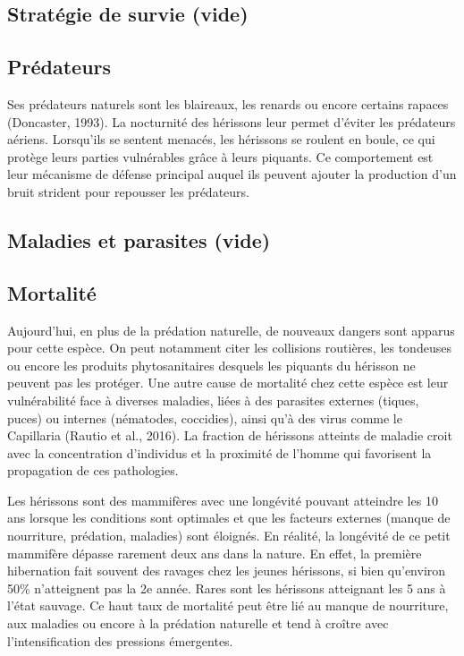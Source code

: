 \documentclass[a4paper,11pt]{article}
\begin{document}
\subsection{Stratégie de survie (vide)}

\subsection{Prédateurs}
Ses prédateurs naturels sont les blaireaux, les renards ou encore certains rapaces (Doncaster, 1993). La nocturnité des hérissons leur permet d’éviter les prédateurs aériens. Lorsqu'ils se sentent menacés, les hérissons se roulent en boule, ce qui protège leurs parties vulnérables grâce à leurs piquants. Ce comportement est leur mécanisme de défense principal auquel ils peuvent ajouter la production d’un bruit strident pour repousser les prédateurs. 

\subsection{Maladies et parasites (vide)}

\subsection{Mortalité}
Aujourd’hui, en plus de la prédation naturelle, de nouveaux dangers sont apparus pour cette espèce. On peut notamment citer les collisions routières, les tondeuses ou encore les produits phytosanitaires desquels les piquants du hérisson ne peuvent pas les protéger. Une autre cause de mortalité chez cette espèce est leur vulnérabilité face à diverses maladies, liées à des parasites externes (tiques, puces) ou internes (nématodes, coccidies), ainsi qu’à des virus comme le Capillaria (Rautio et al., 2016). La fraction de hérissons atteints de maladie croit avec la concentration d’individus et la proximité de l’homme qui favorisent la propagation de ces pathologies.

Les hérissons sont des mammifères avec une longévité pouvant atteindre les 10 ans lorsque les conditions sont optimales et que les facteurs externes (manque de nourriture, prédation, maladies) sont éloignés. En réalité, la longévité de ce petit mammifère dépasse rarement deux ans dans la nature. En effet, la première hibernation fait souvent des ravages chez les jeunes hérissons, si bien qu'environ 50\% n’atteignent pas la 2e année. Rares sont les hérissons atteignant les 5 ans à l’état sauvage. Ce haut taux de mortalité peut être lié au manque de nourriture, aux maladies ou encore à la prédation naturelle et tend à croître avec l’intensification des pressions émergentes.
\end{document}
